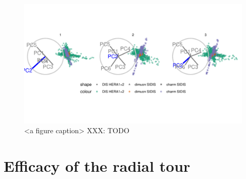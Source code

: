 \documentclass{monashthesis}
\begin{document}
\begin{figure}

{\centering \includegraphics[width=1\linewidth,]{./figures_from_script/ch3_fig7_DIS_worse_pc2} 

}

\caption{<a figure caption> XXX: TODO}\label{fig:ch3fig7}
\end{figure}

\hypertarget{ch:efficacy_radial_tour}{%
\chapter{Efficacy of the radial tour}\label{ch:efficacy_radial_tour}}
\end{document}
